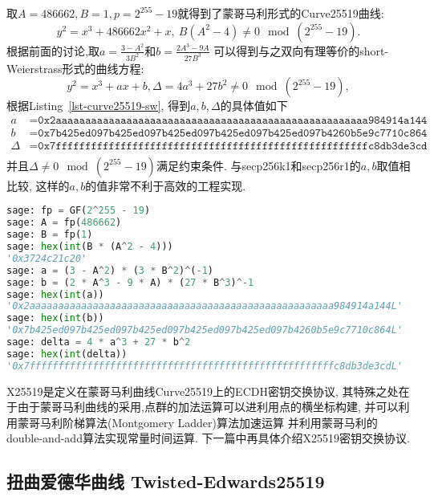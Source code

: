 \documentclass{article}
\begin{document}
取$A = 486662, B = 1, p = 2^{255}-19$就得到了蒙哥马利形式的Curve25519曲线:
$$
y^2 = x^3 + 486662x^2 + x,\  B(A^2-4)\neq 0 \mod (2^{255}-19).
$$
根据前面的讨论,取$a = \frac{3-A^2}{3B^2}$和$b = \frac{2A^3 - 9A}{27B^3}$
可以得到与之双向有理等价的short-Weierstrass形式的曲线方程:
$$
y^2 = x^3 + ax + b, \Delta = 4a^3 + 27b^2 \neq 0\mod (2^{255}-19),
$$
根据Listing~\ref{lst-curve25519-sw}, 得到$a,b,\Delta$的具体值如下
\begin{equation*}
\begin{array}{rl}
a & = \texttt{0x2aaaaaaaaaaaaaaaaaaaaaaaaaaaaaaaaaaaaaaaaaaaaaaaaaaaaa984914a144} \\
b & = \texttt{0x7b425ed097b425ed097b425ed097b425ed097b425ed097b4260b5e9c7710c864} \\
\Delta &= \texttt{0x7fffffffffffffffffffffffffffffffffffffffffffffffffffffc8db3de3cd}\\
\end{array}
\end{equation*}
并且$\Delta\neq 0\mod (2^{255}-19)$满足约束条件.
与secp256k1和secp256r1的$a,b$取值相比较, 这样的$a,b$的值非常不利于高效的工程实现.

\begin{lstlisting}[language = python, caption = Curve25519曲线的short-Weierstrass形式的曲线参数,label=lst-curve25519-sw]
sage: fp = GF(2^255 - 19)
sage: A = fp(486662)
sage: B = fp(1)
sage: hex(int(B * (A^2 - 4)))
'0x3724c21c20'
sage: a = (3 - A^2) * (3 * B^2)^(-1)
sage: b = (2 * A^3 - 9 * A) * (27 * B^3)^-1
sage: hex(int(a))
'0x2aaaaaaaaaaaaaaaaaaaaaaaaaaaaaaaaaaaaaaaaaaaaaaaaaaaaa984914a144L'
sage: hex(int(b))
'0x7b425ed097b425ed097b425ed097b425ed097b425ed097b4260b5e9c7710c864L'
sage: delta = 4 * a^3 + 27 * b^2
sage: hex(int(delta))
'0x7fffffffffffffffffffffffffffffffffffffffffffffffffffffc8db3de3cdL'
\end{lstlisting}

X25519是定义在蒙哥马利曲线Curve25519上的ECDH密钥交换协议,
其特殊之处在于由于蒙哥马利曲线的采用,点群的加法运算可以进利用点的横坐标构建,
并可以利用蒙哥马利阶梯算法(Montgomery Ladder)算法加速运算
并利用蒙哥马利的double-and-add算法实现常量时间运算.
下一篇中再具体介绍X25519密钥交换协议.

\subsection{扭曲爱德华曲线 Twisted-Edwards25519}
\end{document}
